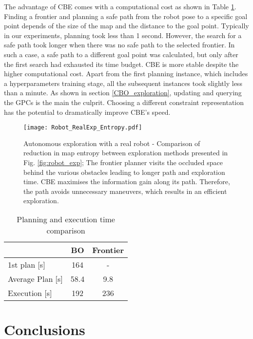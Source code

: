 \documentclass[shortAfour,sageh,times]{sagej_no_sage}
\begin{document}
The advantage of CBE comes with a computational cost as shown in Table \ref{tab:computation_time}. Finding a frontier and planning a safe path from the robot pose to a specific goal point depends of the size of the map and the distance to the goal point. Typically in our experiments, planning took less than 1 second. However, the search for a safe path took longer when there was no safe path to the selected frontier. In such a case, a safe path to a different goal point was calculated, but only after the first search had exhausted its time budget. CBE is more stable despite the higher computational cost. Apart from the first planning instance, which includes a hyperparameters training stage, all the subsequent instances took slightly less than a minute. As shown in section \ref{CBO_exploration}, updating and querying the GPCs is the main the culprit. Choosing a different constraint representation has the potential to dramatically improve CBE's speed.  

\begin{figure}[]
	
	\centering
	
	\texttt{[image: Robot\_RealExp\_Entropy.pdf]}
	\caption{Autonomous exploration with a real robot - Comparison of reduction in map entropy between exploration methods presented in Fig. \ref{fig:robot_exp}; The frontier planner visits the occluded space behind the various obstacles leading to longer path and exploration time. CBE maximises the information gain along its path. Therefore, the path avoids unnecessary maneuvers, which results in an efficient exploration.}
	\label{fig:RobotEtropy}
\end{figure}

\begin{table}[]
	\centering
	\caption{Planning and execution time comparison}
	\label{tab:computation_time}
	\begin{tabular}{|l|c|c|}
		\hline
		& BO   & Frontier \\
		\hline 
		1st plan [s]    & 164  & -                           \\
		Average Plan [s]   & 58.4 & 9.8                          \\
		Execution [s]	& 192 &	236                          \\
		\hline                        
	\end{tabular}
\end{table}

\section{Conclusions}
\label{sec:conclusions}
\end{document}
